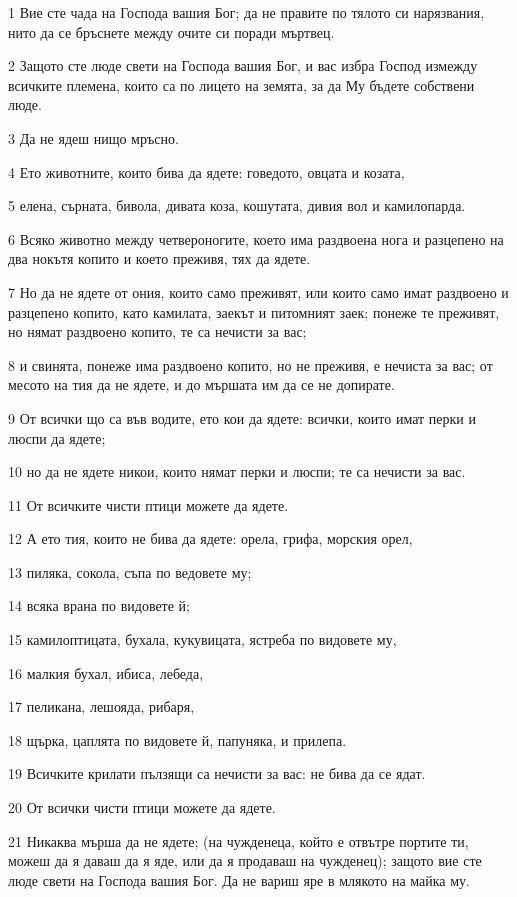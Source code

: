 \par 1 Вие сте чада на Господа вашия Бог; да не правите по тялото си нарязвания, нито да се бръснете между очите си поради мъртвец.
\par 2 Защото сте люде свети на Господа вашия Бог, и вас избра Господ измежду всичките племена, които са по лицето на земята, за да Му бъдете собствени люде.
\par 3 Да не ядеш нищо мръсно.
\par 4 Ето животните, които бива да ядете: говедото, овцата и козата,
\par 5 елена, сърната, бивола, дивата коза, кошутата, дивия вол и камилопарда.
\par 6 Всяко животно между четвероногите, което има раздвоена нога и разцепено на два нокътя копито и което преживя, тях да ядете.
\par 7 Но да не ядете от ония, които само преживят, или които само имат раздвоено и разцепено копито, като камилата, заекът и питомният заек; понеже те преживят, но нямат раздвоено копито, те са нечисти за вас;
\par 8 и свинята, понеже има раздвоено копито, но не преживя, е нечиста за вас; от месото на тия да не ядете, и до мършата им да се не допирате.
\par 9 От всички що са във водите, ето кои да ядете: всички, които имат перки и люспи да ядете;
\par 10 но да не ядете никои, които нямат перки и люспи; те са нечисти за вас.
\par 11 От всичките чисти птици можете да ядете.
\par 12 А ето тия, които не бива да ядете: орела, грифа, морския орел,
\par 13 пиляка, сокола, съпа по ведовете му;
\par 14 всяка врана по видовете й;
\par 15 камилоптицата, бухала, кукувицата, ястреба по видовете му,
\par 16 малкия бухал, ибиса, лебеда,
\par 17 пеликана, лешояда, рибаря,
\par 18 щърка, цаплята по видовете й, папуняка, и прилепа.
\par 19 Всичките крилати пълзящи са нечисти за вас: не бива да се ядат.
\par 20 От всички чисти птици можете да ядете.
\par 21 Никаква мърша да не ядете; (на чужденеца, който е отвътре портите ти, можеш да я даваш да я яде, или да я продаваш на чужденец); защото вие сте люде свети на Господа вашия Бог. Да не вариш яре в млякото на майка му.
